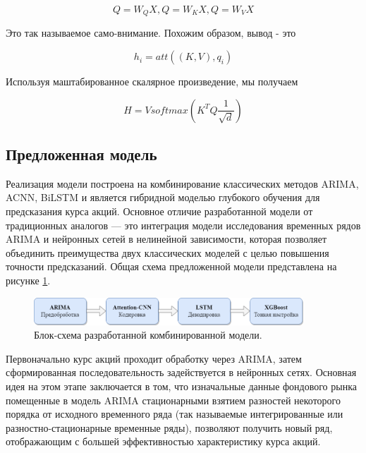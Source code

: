 \begin{equation}
    \label{eq:q}
    Q = W_{Q}X, Q = W_{K}X, Q = W_{V}X
\end{equation}

Это так называемое само-внимание. Похожим образом, вывод - это

\begin{equation}
    \label{eq:h-i}
    h_{i} = att((K, V), q_{i})
\end{equation}

Используя маштабированное скалярное произведение, мы получаем

\begin{equation}
    \label{eq:h-v-softmax}
    H=V softmax( K^{T} Q\frac{1}{\sqrt{d}} )
\end{equation}

\subsection{Предложенная модель}

\par Реализация модели построена на комбинирование классических методов ARIMA, ACNN, BiLSTM и является гибридной моделью глубокого обучения для предсказания курса акций. Основное отличие разработанной модели от традиционных аналогов --- это интеграция модели исследования временных рядов ARIMA и нейронных сетей в нелинейной зависимости, которая позволяет объединить преимущества двух классических моделей с целью повышения точности предсказаний. Общая схема предложенной модели представлена на рисунке \ref{fig:model-scheme}.

\begin{figure}[hbtp]
  \centering
  \includegraphics[width=0.9\textwidth]{img/model.png}
  \caption{Блок-схема разработанной комбинированной модели.}
  \label{fig:model-scheme}
\end{figure}

\par Первоначально курс акций проходит обработку через ARIMA, затем сформированная последовательность задействуется в нейронных сетях. Основная идея на этом этапе заключается в том, что изначальные данные фондового рынка помещенные в модель ARIMA стационарными взятием разностей некоторого порядка от исходного временного ряда (так называемые интегрированные или разностно-стационарные временные ряды), позволяют получить новый ряд, отображающим с большей эффективностью характеристику курса акций.

